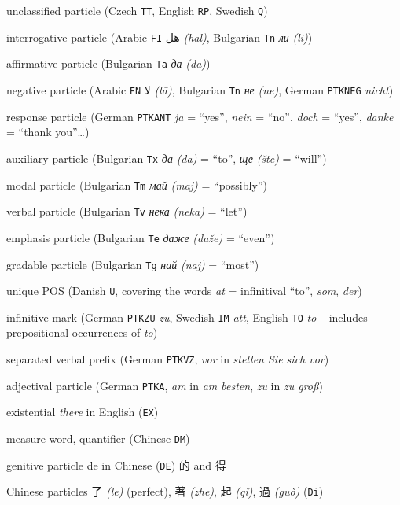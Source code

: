 \documentclass[11pt]{article}
\newcommand{\ar}[1]{{\arfont #1}}
\newcommand{\zh}[1]{{\zhfont #1}}
\newcommand{\translit}[1]{{\translitfont \textit{(#1)}}}
\begin{document}
\begin{compactitem}
\item unclassified particle (Czech \texttt{TT}, English \texttt{RP}, Swedish \texttt{Q})
\item interrogative particle (Arabic \texttt{FI} \ar{هل} \translit{hal}, Bulgarian \texttt{Tn} \textit{ли} \translit{li})
\item affirmative particle (Bulgarian \texttt{Ta} \textit{да} \translit{da})
\item negative particle (Arabic \texttt{FN} \ar{لا} \translit{lā}, Bulgarian \texttt{Tn} \textit{не} \translit{ne}, German \texttt{PTKNEG} \textit{nicht})
\item response particle (German \texttt{PTKANT} \textit{ja} = “yes”, \textit{nein} = “no”, \textit{doch} = “yes”, \textit{danke} = “thank you”…)
\item auxiliary particle (Bulgarian \texttt{Tx} \textit{да} \translit{da} = “to”, \textit{ще} \translit{šte} = “will”)
\item modal particle (Bulgarian \texttt{Tm} \textit{май} \translit{maj} = “possibly”)
\item verbal particle (Bulgarian \texttt{Tv} \textit{нека} \translit{neka} = “let”)
\item emphasis particle (Bulgarian \texttt{Te} \textit{даже} \translit{daže} = “even”)
\item gradable particle (Bulgarian \texttt{Tg} \textit{най} \translit{naj} = “most”)
\item unique POS (Danish \texttt{U}, covering the words \textit{at} = infinitival “to”, \textit{som}, \textit{der})
\item infinitive mark (German \texttt{PTKZU} \textit{zu}, Swedish \texttt{IM} \textit{att}, English \texttt{TO} \textit{to} – includes prepositional occurrences of \textit{to})
\item separated verbal prefix (German \texttt{PTKVZ}, \textit{vor} in \textit{stellen Sie sich vor})
\item adjectival particle (German \texttt{PTKA}, \textit{am} in \textit{am besten}, \textit{zu} in \textit{zu groß})
\item existential \textit{there} in English (\texttt{EX})
\item measure word, quantifier (Chinese \texttt{DM})
\item genitive particle de in Chinese (\texttt{DE}) \zh{的} and \zh{得}
\item Chinese particles \zh{了} \translit{le} (perfect), \zh{著} \translit{zhe}, \zh{起} \translit{qǐ}, \zh{過} \translit{guò} (\texttt{Di})

\end{compactitem}
\end{document}
